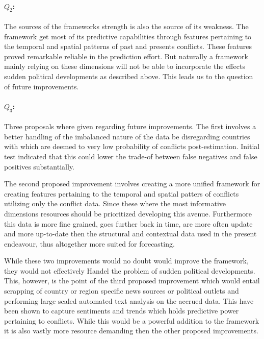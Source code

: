 \documentclass[a4paper]{article}
\begin{document}
\paragraph{$Q_2$:} The sources of the frameworks strength is also the source of its weakness. The framework get most of its predictive capabilities through features pertaining to the temporal and spatial patterns of past and presents conflicts. These features proved remarkable reliable in the prediction effort. But naturally a framework mainly relying on these dimensions will not be able to incorporate the effects sudden political developments as described above. This leads us to the question of future improvements.\par 

\paragraph{$Q_3$:} Three proposals where given regarding future improvements. The first involves a better handling of the imbalanced nature of the data be disregarding countries with which are deemed to very low probability of conflicts post-estimation. Initial test indicated that this could lower the trade-of between false negatives and false positives substantially.\par

The second proposed improvement involves creating a more unified framework for creating features pertaining to the temporal and spatial patters of conflicts utilizing only the conflict data. Since these where the most informative dimensions resources should be prioritized developing this avenue. Furthermore this data is more fine grained, goes further back in time, are more often update and more up-to-date then the structural and contextual data used in the present endeavour, thus altogether more suited for forecasting.\par

While these two improvements would no doubt would improve the framework, they would not effectively Handel the problem of sudden political developments. This, however, is the point of the third proposed improvement which would entail scrapping of country or region specific news sources or political outlets and performing large scaled automated text analysis on the accrued data. This have been shown to capture sentiments and trends which holds predictive power pertaining to conflicts. While this would be a powerful addition to the framework it is also vastly more resource demanding then the other proposed improvements.\par
\end{document}
